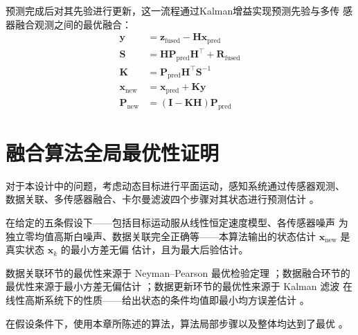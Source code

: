 \documentclass[12pt,a4paper]{ctexart}
\begin{document}
预测完成后对其先验进行更新，这一流程通过Kalman增益实现预测先验与多传
感器融合观测之间的最优融合\cite{kalman1960,bar2001estimation}：
\begin{align}
\mathbf{y}     &= \mathbf{z}_{\mathrm{fused}} - \mathbf{H}\mathbf{x}_{\mathrm{pred}} \\
\mathbf{S}     &= \mathbf{H}\mathbf{P}_{\mathrm{pred}}\mathbf{H}^{\top} + \mathbf{R}_{\mathrm{fused}} \\
\mathbf{K}     &= \mathbf{P}_{\mathrm{pred}}\mathbf{H}^{\top}\mathbf{S}^{-1} \\
\mathbf{x}_{\mathrm{new}} &= \mathbf{x}_{\mathrm{pred}} + \mathbf{K}\mathbf{y} \\
\mathbf{P}_{\mathrm{new}} &= (\mathbf{I} - \mathbf{K}\mathbf{H})\mathbf{P}_{\mathrm{pred}}
\end{align}

\section{融合算法全局最优性证明}

对于本设计中的问题，考虑动态目标进行平面运动，感知系统通过传感器观测、
数据关联、多传感器融合、卡尔曼滤波四个步骤对其状态进行预测估计
\cite{bar2001estimation}。

在给定的五条假设下——包括目标运动服从线性恒定速度模型、各传感器噪声
为独立零均值高斯白噪声、数据关联完全正确等——本算法输出的状态估计
$\mathbf{x}_{\mathrm{new}}$ 是真实状态 $\mathbf{x}_k$ 的最小方差无偏
估计\cite{aitken1935}，且为最大后验估计\cite{casella2002statistical}。

数据关联环节的最优性来源于 Neyman--Pearson 最优检验定理
\cite{neyman1933}；数据融合环节的最优性来源于最小方差无偏估计
\cite{aitken1935,li2003fusion}；数据更新环节的最优性来源于 Kalman 滤波
在线性高斯系统下的性质——给出状态的条件均值即最小均方误差估计
\cite{kalman1960,bar2001estimation}。

在假设条件下，使用本章所陈述的算法，算法局部步骤以及整体均达到了最优
\cite{kalman1960,neyman1933,aitken1935,bar2001estimation}。



\end{document}
